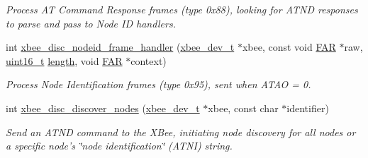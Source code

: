 \begin{DoxyCompactItemize}
\begin{DoxyCompactList}\small\item\em Process A\-T Command Response frames (type 0x88), looking for A\-T\-N\-D responses to parse and pass to Node I\-D handlers. \end{DoxyCompactList}\item 
int \hyperlink{group__xbee__discovery_gac15854e05ef3f80d6ddae653065c0a40}{xbee\-\_\-disc\-\_\-nodeid\-\_\-frame\-\_\-handler} (\hyperlink{structxbee__dev__t}{xbee\-\_\-dev\-\_\-t} $\ast$xbee, const void \hyperlink{group__hal_gaef060b3456fdcc093a7210a762d5f2ed}{F\-A\-R} $\ast$raw, \hyperlink{group__hal_ga5a8b2dc9e45a9ee81a94ef304fb62505}{uint16\-\_\-t} \hyperlink{group__zdo_gab2b3adeb2a67e656ff030b56727fd0ac}{length}, void \hyperlink{group__hal_gaef060b3456fdcc093a7210a762d5f2ed}{F\-A\-R} $\ast$context)
\begin{DoxyCompactList}\small\item\em Process Node Identification frames (type 0x95), sent when A\-T\-A\-O = 0. \end{DoxyCompactList}\item 
int \hyperlink{group__xbee__discovery_ga12d6a10c8348cf5eb9636bbf02420dd3}{xbee\-\_\-disc\-\_\-discover\-\_\-nodes} (\hyperlink{structxbee__dev__t}{xbee\-\_\-dev\-\_\-t} $\ast$xbee, const char $\ast$identifier)
\begin{DoxyCompactList}\small\item\em Send an A\-T\-N\-D command to the X\-Bee, initiating node discovery for all nodes or a specific node's \char`\"{}node identification\char`\"{} (A\-T\-N\-I) string. \end{DoxyCompactList}\end{DoxyCompactItemize}
